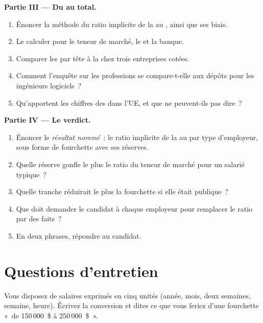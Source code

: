 \begin{problem}
\medskip\noindent\textbf{Partie III --- Du  au total.}
\begin{enumerate}[resume]
\item Énoncer la méthode du ratio implicite de la  au , ainsi que ses biais.
\item Le calculer pour le teneur de marché, le  et la banque.
\item Comparer les  par tête à la  chez trois entreprises cotées.
\item Comment l'enquête sur les professions se compare-t-elle aux dépôts pour les ingénieurs logiciels~?
\item Qu'apportent les chiffres des  dans l'UE, et que ne peuvent-ils pas dire~?
\end{enumerate}

\medskip\noindent\textbf{Partie IV --- Le verdict.}
\begin{enumerate}[resume]
\item Énoncer le \emph{résultat nommé}~: le ratio implicite de la  au  par type d'employeur, sous forme de fourchette avec ses réserves.
\item Quelle réserve gonfle le plus le ratio du teneur de marché pour un salarié typique~?
\item Quelle tranche réduirait le plus la fourchette si elle était publique~?
\item Que doit demander le candidat à chaque employeur pour remplacer le ratio par des faits~?
\item En deux phrases, répondre au candidat.
\end{enumerate}
\end{problem}

\section{Questions d'entretien}

\begin{interviewq}\label{iq:in:pay-levels-by-role-firm-type-and-seniority:1}
Vous disposez de salaires exprimés en cinq unités (année, mois, deux semaines, semaine, heure). Écrivez la conversion et dites ce que vous feriez
d'une fourchette «~de 150\,000~\$ à 250\,000~\$~».
\end{interviewq}

